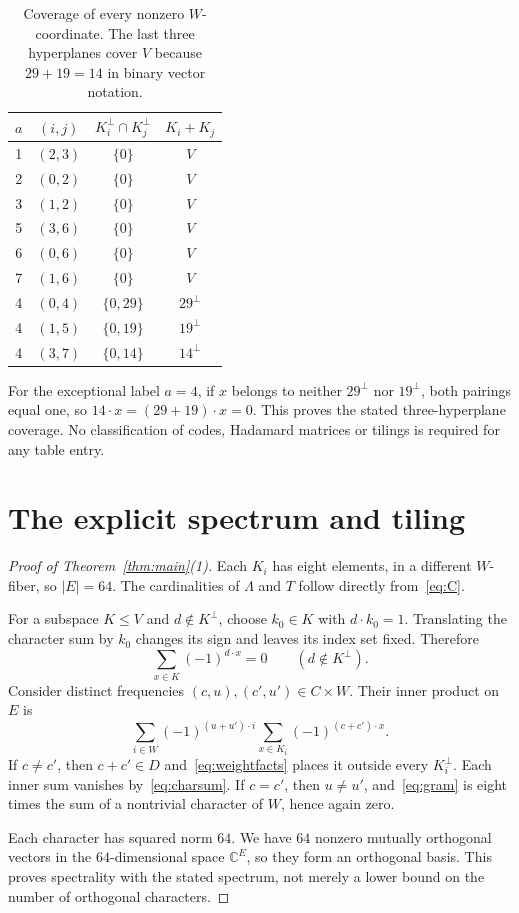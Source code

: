 \documentclass[11pt]{article}
\theoremstyle{definition}\newtheorem{definition}[theorem]{Definition}
\theoremstyle{remark}\newtheorem{remark}[theorem]{Remark}
\newcommand{\C}{\mathbb C}
\begin{document}
\begin{table}[htbp]
\centering
\begin{tabular}{@{}cccc@{}}
\toprule
$a$&$(i,j)$&$K_i^\perp\cap K_j^\perp$&$K_i+K_j$\\
\midrule
1&$(2,3)$&$\{0\}$&$V$\\
2&$(0,2)$&$\{0\}$&$V$\\
3&$(1,2)$&$\{0\}$&$V$\\
5&$(3,6)$&$\{0\}$&$V$\\
6&$(0,6)$&$\{0\}$&$V$\\
7&$(1,6)$&$\{0\}$&$V$\\
\midrule
4&$(0,4)$&$\{0,29\}$&$29^\perp$\\
4&$(1,5)$&$\{0,19\}$&$19^\perp$\\
4&$(3,7)$&$\{0,14\}$&$14^\perp$\\
\bottomrule
\end{tabular}
\caption{Coverage of every nonzero $W$-coordinate. The last three hyperplanes cover $V$ because $29+19=14$ in binary vector notation.}\label{tab:cross}
\end{table}

For the exceptional label $a=4$, if $x$ belongs to neither $29^\perp$ nor $19^\perp$, both pairings equal one, so $14\cdot x=(29+19)\cdot x=0$. This proves the stated three-hyperplane coverage. No classification of codes, Hadamard matrices or tilings is required for any table entry.

\section{The explicit spectrum and tiling}

\begin{proof}[Proof of Theorem~\ref{thm:main}(1)]
Each $K_i$ has eight elements, in a different $W$-fiber, so $|E|=64$. The cardinalities of $\Lambda$ and $T$ follow directly from~\eqref{eq:C}.

For a subspace $K\leq V$ and $d\notin K^\perp$, choose $k_0\in K$ with $d\cdot k_0=1$. Translating the character sum by $k_0$ changes its sign and leaves its index set fixed. Therefore
\begin{equation}\label{eq:charsum}
\sum_{x\in K}(-1)^{d\cdot x}=0\qquad(d\notin K^\perp).
\end{equation}
Consider distinct frequencies $(c,u),(c',u')\in C\times W$. Their inner product on $E$ is
\begin{equation}\label{eq:gram}
\sum_{i\in W}(-1)^{(u+u')\cdot i}
       \sum_{x\in K_i}(-1)^{(c+c')\cdot x}.
\end{equation}
If $c\ne c'$, then $c+c'\in D$ and~\eqref{eq:weightfacts} places it outside every $K_i^\perp$. Each inner sum vanishes by~\eqref{eq:charsum}. If $c=c'$, then $u\ne u'$, and~\eqref{eq:gram} is eight times the sum of a nontrivial character of $W$, hence again zero.

Each character has squared norm $64$. We have $64$ nonzero mutually orthogonal vectors in the $64$-dimensional space $\C^E$, so they form an orthogonal basis. This proves spectrality with the stated spectrum, not merely a lower bound on the number of orthogonal characters.
\end{proof}
\end{document}
